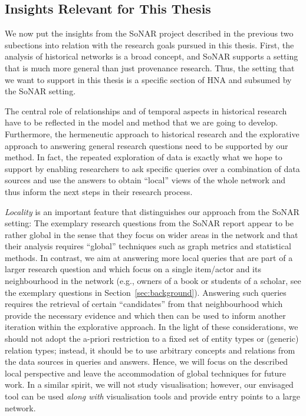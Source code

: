 
\subsection{Insights Relevant for This Thesis}

We now put the insights from the SoNAR project described in the previous two subections
into relation with the research goals pursued in this thesis.
First, the analysis of historical networks is a broad concept, and SoNAR supports a setting
that is much more general than just provenance research.
Thus, the setting that we want to support in this thesis is a specific section of HNA and subsumed 
by the SoNAR setting.

The central role of relationships and of temporal aspects in historical research
have to be reflected in the model and method that we are going to develop.
Furthermore, the hermeneutic approach to historical research
and the explorative approach to answering general research questions 
need to be supported by our method. In fact, the repeated exploration of data
is exactly what we hope to support by enabling researchers to ask specific
queries over a combination of data sources and use the answers to obtain
\enquote{local} views of the whole network and thus inform the next steps in their research process.

\emph{Locality} is an important feature that distinguishes our approach from the SoNAR setting:
The exemplary research questions from the SoNAR report appear to be rather global
in the sense that they focus on wider areas in the network and that their analysis requires
\enquote{global} techniques such as graph metrics and statistical methods.
In contrast, we aim at answering more local queries
that are part of a larger research question and which 
focus on a single item/actor and its neighbourhood in the network
(e.g., owners of a book or students of a scholar, see the exemplary questions
in Section~\ref{sec:background}). Answering such queries
requires the retrieval of certain \enquote{candidates} from that neighbourhood
which provide the necessary evidence and which then can be used
to inform another iteration within the explorative approach.
In the light of these considerations, 
we should not adopt the a-priori restriction
to a fixed set of entity types or (generic) relation types;
instead, it should be to use arbitrary concepts and relations
from the data sources in queries and answers.
Hence, we will focus on the described local perspective
and leave the accommodation of global techniques for future work.
In a similar spirit, we will not study visualisation;
however, our envisaged tool can be used \emph{along with} visualisation tools
and provide entry points to a large network.

